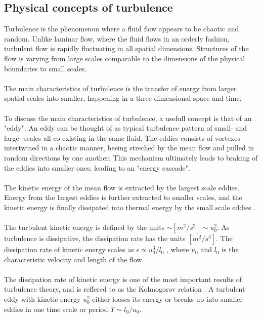 \documentclass[a4paper, 12pt]{report}
\begin{document}
\subsection{Physical concepts of turbulence}
Turbulence is the phenomenon where a fluid flow appears to be chaotic and random. Unlike laminar flow, where the fluid flows in an orderly fashion, turbulent flow is rapidly fluctuating in all spatial dimensions. Structures of the flow is varying from large scales comparable to the dimensions of the physical boundaries to small scales.\\
\\
The main characteristics of turbulence is the transfer of energy from larger spatial scales into smaller, happening in a three dimensional space and time.\\
\\
 To discuss the main characteristics of turbulence, a usefull concept is that of an "eddy". An eddy can be thought of as typical turbulence pattern of small- and large- scales all co-existing in the same fluid. The eddies consists of vortexes intertwined in a chaotic manner, beeing streched by the mean flow and pulled in random directions by one another. This mechanism ultimately leads to braking of the eddies into smaller ones, leading to an "energy cascade"\cite{CFD}.\\
\\
The kinetic energy of the mean flow is extracted by the largest scale eddies. Energy from the largest eddies is further extracted to smaller scales, and the kinetic energy is finally dissipated into thermal energy by the small scale eddies \cite{CFD}.\\
\\
The turbulent kinetic energy is defined by the units $\sim [m^2/s^2] \sim u_0^2$. As turbulence is dissipative, the dissipation rate has the units $[m^2/s^3]$. The dissipation rate of kinetic energy scales as $\epsilon \propto u_0^3/l_0$ \cite{Turbulence}, where $u_0$ and $l_0$ is the characteristic velocity and length of the flow.\\
\\
The dissipation rate of kinetic energy is one of the most important results of turbulence theory, and is reffered to as the Kolmogorov relation \cite{Turbulence}. A turbulent eddy with kinetic energy $u_0^2$ either looses its energy or breaks up into smaller eddies in one time scale or period $T \sim l_0/u_0$.\\
\\
\end{document}
